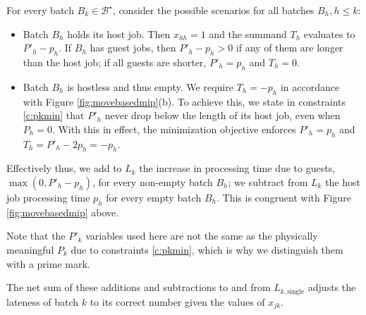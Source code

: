 \documentclass[oribibl]{llncs}
\begin{document}
  For every batch $B_k \in \mathcal{B}^\star$, consider the possible scenarios for all batches
$B_h, h \leq k$:
\begin{itemize}
  \item{Batch $B_h$ holds its host job. Then $x_{hh}=1$ and the summand $T_h$ evaluates
      to $P'_h - p_h$. If $B_h$ has guest jobs, then $P'_h - p_h > 0$ if any of
      them are longer than the host job; if all guests are shorter, $P'_h=p_h$
    and $T_h = 0$.}
  \item{Batch $B_h$ is hostless and thus empty. We require $T_h = -p_h$ in
      accordance with Figure \ref{fig:movebasedmip}(b). To achieve this, we
      state in constraints \eqref{c:pkmin} that $P'_h$ never drop below the
      length of its host job, even when $P_h=0$. With this in effect, the
      minimization objective enforces $P'_h = p_h$ and $T_h = P'_h - 2p_h =
    -p_h$.}
\end{itemize}
Effectively thus, we add to $L_k$ the increase in processing time due
to guests, $\max(0, P'_h-p_h)$, for every non-empty batch $B_h$; we
subtract from $L_k$ the host job processing time $p_h$ for every empty
batch $B_h$. This is congruent with Figure \ref{fig:movebasedmip} above.

Note that the $P'_k$ variables used here are not the same as the
physically meaningful $P_k$ due to constraints \eqref{c:pkmin}, which is
why we distinguish them with a prime mark.


The net sum of these additions and subtractions to and from
$L_{k,\mathrm{single}}$ adjusts the lateness of batch $k$ to its correct number
given the values of $x_{jk}$.
\end{document}
